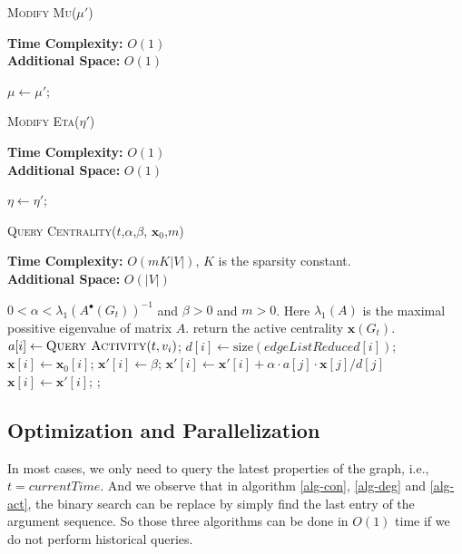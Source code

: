\documentclass[12pt,abstract=true]{scrartcl}
\numberwithin{equation}{section}
\theoremstyle{definition}   \newtheorem{definition}{Definition}[section]
\theoremstyle{plain}        \newtheorem{theorem}{Theorem}[section]
\theoremstyle{plain}        \newtheorem{observation}{Observation}[section]
\theoremstyle{plain}        \newtheorem{fact}{Fact}[section]
\theoremstyle{plain}        \newtheorem{claim}{Claim}[section]
\theoremstyle{plain}        \newtheorem{lemma}[theorem]{Lemma}
\theoremstyle{plain}        \newtheorem{corollary}[theorem]{Corollary}
\theoremstyle{remark}       \newtheorem{example}{Example}[section]
\theoremstyle{remark}       \newtheorem{remark}{Remark}[section]
\begin{document}
\begin{algorithm}[htbp]
\caption{\textsc{Modify Mu}($\mu'$)}
\label{alg-mu}
\textbf{Time Complexity:} $O(1)$\\
\textbf{Additional Space:} $O(1)$
\begin{algorithmic}[1]
\State $\mu\gets\mu'$;
\end{algorithmic}
\end{algorithm}

\begin{algorithm}[htbp]
\caption{\textsc{Modify Eta}($\eta'$)}
\label{alg-eta}
\textbf{Time Complexity:} $O(1)$\\
\textbf{Additional Space:} $O(1)$
\begin{algorithmic}[1]
\State $\eta\gets\eta'$;\State{}
\end{algorithmic}
\end{algorithm}


\begin{algorithm}[htbp]
\caption{\textsc{Query Centrality}($t$,$\alpha$,$\beta$,
$\mathbf{x}_0$,$m$)}
\label{alg-cen}
\textbf{Time Complexity:} $O(mK|V|)$, $K$ is the sparsity constant.\\
\textbf{Additional Space:} $O(|V|)$
\begin{algorithmic}[1]
\Require $0<\alpha<\lambda_1(A^\bullet(G_t))^{-1}$ and $\beta>0$ and $m>0$. Here
$\lambda_1(A)$ is the maximal possitive eigenvalue of matrix $A$.
\Ensure return the active centrality $\mathbf{x}(G_t)$.
\State $a[i]\gets \Call{Query Activity}{t,v_i}$;
\State $d[i]\gets \mathrm{size}(\mathit{edgeListReduced}[i])$;
\State $\mathbf{x}[i]\gets \mathbf{x}_0[i]$;
\EndFor
{}
\State $\mathbf{x'}[i]\gets \beta$;
\EndFor
{}
\State $\mathbf{x'}[i]\gets \mathbf{x'}[i]+\alpha\cdot
a[j]\cdot\mathbf{x}[j]/d[j]$
\EndFor\EndFor
{}
\State $\mathbf{x}[i]\gets \mathbf{x'}[i]$;
\EndFor
\EndFor
\State{};
\end{algorithmic}
\end{algorithm}

\subsection{Optimization and Parallelization}
In most cases, we only need to query the latest properties of the graph, i.e.,
$t=\mathit{currentTime}$. And we observe that in algorithm \ref{alg-con},
\ref{alg-deg} and \ref{alg-act}, the binary search can be replace by simply find
the last entry of the argument sequence. So those three algorithms can be done
in $O(1)$ time if we do not perform historical queries.
\end{document}
